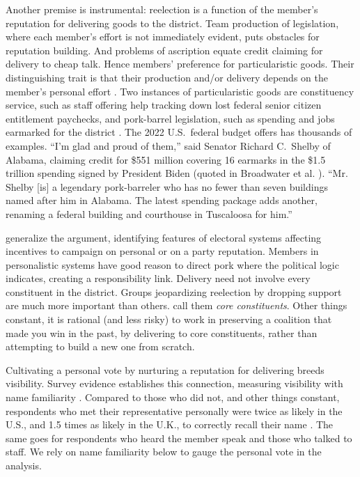 \documentclass[letter,12pt]{article}
\begin{document}
Another premise is instrumental: reelection is a function of the member's reputation for delivering goods to the district. Team production of legislation, where each member's effort is not immediately evident, puts obstacles for reputation building. And problems of ascription equate credit claiming for delivery to cheap talk. Hence members' preference for particularistic goods. Their distinguishing trait is that their production and/or delivery depends on the member's personal effort \citep{haggard.mccubbins.2001}. Two instances of particularistic goods are constituency service, such as staff offering help tracking down lost federal senior citizen entitlement paychecks, and pork-barrel legislation, such as spending and jobs earmarked for the district \citep{cain.etal.1987}. The 2022 U.S.\ federal budget offers has thousands of examples. ``I'm glad and proud of them,'' said Senator Richard C.\ Shelby of Alabama, claiming credit for \$551 million covering 16 earmarks in the \$1.5 trillion spending signed by President Biden (quoted in Broadwater et al. \citeyear{nyt-pork.2022}). ``Mr. Shelby [is] a legendary pork-barreler who has no fewer than seven buildings named after him in Alabama. The latest spending package adds another, renaming a federal building and courthouse in Tuscaloosa for him.'' 

\citet{carey.shugart.1995} generalize the argument, identifying features of electoral systems affecting incentives to campaign on personal or on a party reputation. Members in personalistic systems have good reason to direct pork where the political logic indicates, creating a responsibility link. Delivery need not involve every constituent in the district. Groups jeopardizing reelection by dropping support are much more important than others. \citet{cox.mccubbins.1986} call them \emph{core constituents}. Other things constant, it is rational (and less risky) to work in preserving a coalition that made you win in the past, by delivering to core constituents, rather than attempting to build a new one from scratch.

Cultivating a personal vote by nurturing a reputation for delivering breeds visibility. Survey evidence establishes this connection, measuring visibility with name familiarity \citep{abramowitz1975name-familiarity}. Compared to those who did not, and other things constant, respondents who met their representative personally were twice as likely in the U.S., and 1.5 times as likely in the U.K., to correctly recall their name \citep[][:34]{cain.etal.1987}. The same goes for respondents who heard the member speak and those who talked to staff. We rely on name familiarity below to gauge the personal vote in the analysis. 
\end{document}
